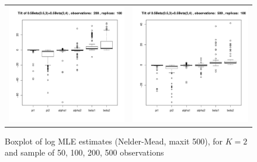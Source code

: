 \documentclass[10pt]{report}
\begin{document}
\begin{figure}[h]
\begin{tabular}{cc}
\includegraphics[width=\textwidth/2]{../img/p05_a05_b3_p05_a2_b4/tilted/K2/bxplots/n200_R100.pdf}
&
\includegraphics[width=\textwidth/2]{../img/p05_a05_b3_p05_a2_b4/tilted/K2/bxplots/n500_R100.pdf}\\
\end{tabular}
\caption{Boxplot of log MLE estimates (Nelder-Mead, maxit 500), for $K=2$ and sample of 50, 100, 200, 500 observations}
\label{fig:TBD2}
\end{figure}
\end{document}
